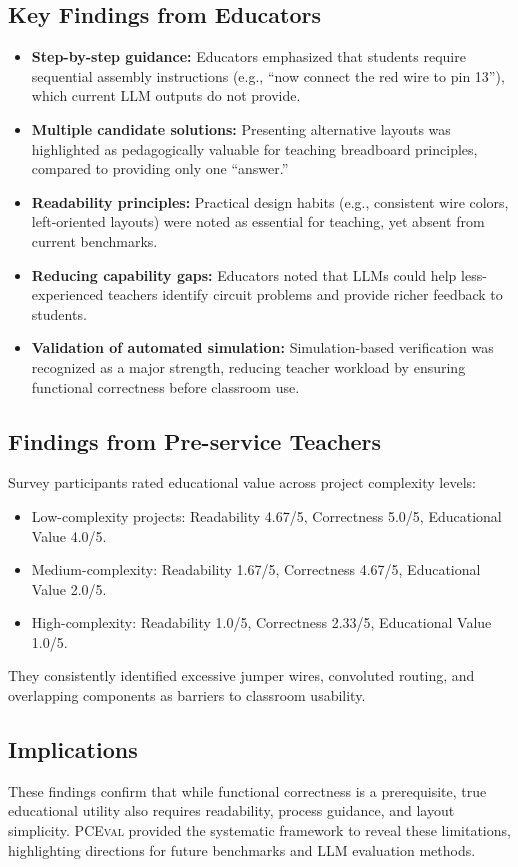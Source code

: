 \documentclass{article} %
\begin{document}
\subsection{Key Findings from Educators}
\begin{itemize}
    \item \textbf{Step-by-step guidance:} Educators emphasized that students require sequential assembly instructions (e.g., “now connect the red wire to pin 13”), which current LLM outputs do not provide.
    \item \textbf{Multiple candidate solutions:} Presenting alternative layouts was highlighted as pedagogically valuable for teaching breadboard principles, compared to providing only one “answer.”
    \item \textbf{Readability principles:} Practical design habits (e.g., consistent wire colors, left-oriented layouts) were noted as essential for teaching, yet absent from current benchmarks.
    \item \textbf{Reducing capability gaps:} Educators noted that LLMs could help less-experienced teachers identify circuit problems and provide richer feedback to students.
    \item \textbf{Validation of automated simulation:} Simulation-based verification was recognized as a major strength, reducing teacher workload by ensuring functional correctness before classroom use.
\end{itemize}

\subsection{Findings from Pre-service Teachers}
Survey participants rated educational value across project complexity levels:
\begin{itemize}
    \item Low-complexity projects: Readability 4.67/5, Correctness 5.0/5, Educational Value 4.0/5.
    \item Medium-complexity: Readability 1.67/5, Correctness 4.67/5, Educational Value 2.0/5.
    \item High-complexity: Readability 1.0/5, Correctness 2.33/5, Educational Value 1.0/5.
\end{itemize}
They consistently identified excessive jumper wires, convoluted routing, and overlapping components as barriers to classroom usability.

\subsection{Implications}
These findings confirm that while functional correctness is a prerequisite, true educational utility also requires readability, process guidance, and layout simplicity. \textsc{PCEval} provided the systematic framework to reveal these limitations, highlighting directions for future benchmarks and LLM evaluation methods.
\end{document}
